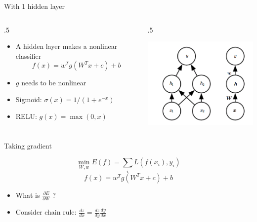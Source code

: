 \documentclass[12pt,notes,mathserif]{beamer}
\newcommand{\begincols}[1]{\begin{column}{#1}}
\newcommand{\stopcols}{\end{column}}
\begin{document}
\begin{frame}{With 1 hidden layer}

\begin{columns}
    \begincols{.5\textwidth}
        \begin{itemize}
            \item A hidden layer makes a nonlinear classifier
            $$
            f(x)=w^{{T}}g(W^{{T}}x+c)+b
            $$
            \item  ${g}$ needs to be nonlinear
            \item Sigmoid: $\sigma(x)=1/(1+e^{-x})$
            \item RELU: $g({x})=\max(0,{x})$
        \end{itemize}
    \stopcols
    \begincols{.5\textwidth}
    \begin{center}
        \includegraphics[width=\textwidth]{2018-04-15-13-08-28.png}
    \end{center}
    \stopcols
        
\end{columns}

\end{frame}

\begin{frame}{Taking gradient}

\[
\min_{W,w}E(f)=\sum_{i}L(f(x_{i}),y_{i})
\] \[
f(x)=w^{T}g(W^{T}x+c)+b
\]

\begin{itemize}
\item
  What is \(\frac{\partial E}{\partial W}\) ?
\item
  Consider chain rule: \(\frac{dz}{dx}=\frac{dz}{dy}\frac{dy}{dx}\)
\end{itemize}

\end{frame}
\end{document}
